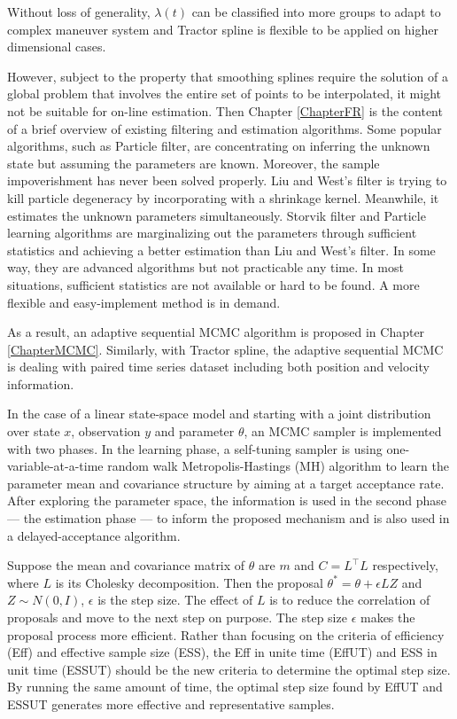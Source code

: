 Without loss of generality, $\lambda(t)$ can be classified into more groups to adapt to complex maneuver system and Tractor spline is flexible to be applied on higher dimensional cases. 

However, subject to the property that smoothing splines require the solution of a global problem that involves the entire set of points to be interpolated, it might not be suitable for on-line estimation. Then Chapter \ref{ChapterFR} is the content of a brief overview of existing filtering and estimation algorithms. Some popular algorithms, such as Particle filter, are concentrating on inferring the unknown state but assuming the parameters are known. Moreover, the sample impoverishment has never been solved properly. Liu and West's filter is trying to kill particle degeneracy by incorporating with a shrinkage kernel. Meanwhile, it estimates the unknown parameters simultaneously. Storvik filter and Particle learning algorithms are marginalizing out the parameters through sufficient statistics and achieving a better estimation than Liu and West's filter. In some way, they are advanced algorithms but not practicable any time. In most situations, sufficient statistics are not available or hard to be found. A more flexible and easy-implement method is in demand. 
 
As a result, an adaptive sequential MCMC algorithm is proposed in Chapter \ref{ChapterMCMC}. Similarly, with Tractor spline, the adaptive sequential MCMC is dealing with paired time series dataset including both position and velocity information. 

In the case of a linear state-space model and starting with a joint distribution over state $x$, observation $y$ and parameter $\theta$, an MCMC sampler is implemented with two phases. In the learning phase, a self-tuning sampler is using one-variable-at-a-time random walk Metropolis-Hastings (MH) algorithm to learn the parameter mean and covariance structure by aiming at a target acceptance rate. After exploring the parameter space, the information is used in the second phase --- the estimation phase --- to inform the proposed mechanism and is also used in a delayed-acceptance algorithm. 

Suppose the mean and covariance matrix of $\theta$ are $m$ and $C=L^\top L$ respectively, where $L$ is its Cholesky decomposition. Then the proposal $\theta^*=\theta + \epsilon LZ$ and $Z\sim N(0,I)$, $\epsilon$ is the step size. The effect of $L$ is to reduce the correlation of proposals and move to the next step on purpose. The step size $\epsilon$ makes the proposal process more efficient. Rather than focusing on the criteria of efficiency (Eff) and effective sample size (ESS), the Eff in unite time (EffUT) and ESS in unit time (ESSUT) should be the new criteria to determine the optimal step size. By running the same amount of time, the optimal step size found by EffUT and ESSUT generates more effective and representative samples. 


